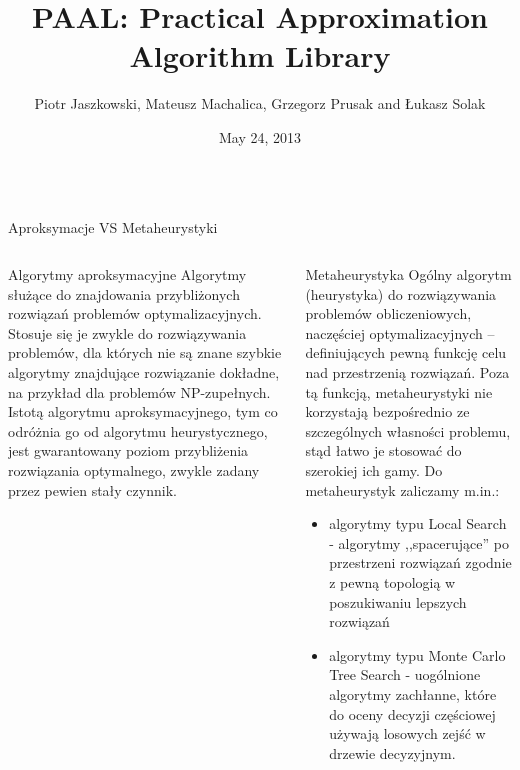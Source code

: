 \documentclass[final,hyperref={pdfpagelabels=false}]{beamer}
\title{\huge PAAL: Practical Approximation Algorithm Library}
\author{Piotr Jaszkowski, Mateusz Machalica, Grzegorz Prusak and Łukasz Solak}
\institute[University of Warsaw]{The Faculty of Mathematics, Informatics and Mechanics, University of Warsaw, Warsaw, Poland}
\date[May 24, 2013]{May 24, 2013}
\begin{document}
\begin{frame}

	\begin{columns}
		\begin{column}{.96\textwidth}
			\vspace{1cm}
			\begin{center}
			\veryHuge Aproksymacje VS Metaheurystyki
			\end{center}
			\vspace{1cm}
		\end{column}
	\end{columns}

	\begin{columns}
		\begin{column}{.46\textwidth}
			\begin{block}{Algorytmy aproksymacyjne}
        Algorytmy służące do znajdowania przybliżonych rozwiązań problemów optymalizacyjnych. Stosuje się je zwykle do rozwiązywania problemów, dla których nie
        są znane szybkie algorytmy znajdujące rozwiązanie dokładne, na przykład dla problemów NP-zupełnych.  Istotą algorytmu aproksymacyjnego, tym co odróżnia
        go od algorytmu heurystycznego, jest gwarantowany poziom przybliżenia rozwiązania optymalnego, zwykle zadany przez pewien stały czynnik.  \vspace{5cm}
			\end{block}
		\end{column}

		\begin{column}{.46\textwidth}
      \begin{block}{Metaheurystyka}
        Ogólny algorytm (heurystyka) do rozwiązywania problemów obliczeniowych, naczęściej optymalizacyjnych -- definiujących pewną funkcję celu nad
        przestrzenią rozwiązań. Poza tą funkcją, metaheurystyki nie korzystają bezpośrednio ze szczególnych własności problemu, stąd łatwo je stosować do
        szerokiej ich gamy. Do metaheurystyk zaliczamy m.in.:
				\begin{itemize}
        \item algorytmy typu Local Search - algorytmy ,,spacerujące'' po przestrzeni rozwiązań zgodnie z pewną topologią w poszukiwaniu lepszych rozwiązań
        \item algorytmy typu Monte Carlo Tree Search - uogólnione algorytmy zachłanne, które do oceny decyzji częściowej używają losowych zejść w drzewie
          decyzyjnym.
				\end{itemize}
			\end{block}
		\end{column}
	\end{columns}
	

\end{frame}
\end{document}
